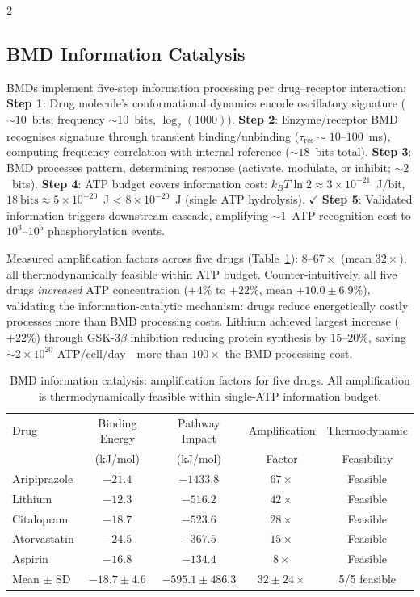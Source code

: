 \begin{multicols}{2}
\subsection{BMD Information Catalysis}
\label{ssec:bmd_catalysis}

BMDs implement five-step information processing per drug--receptor interaction:
\textbf{Step 1}: Drug molecule's conformational dynamics encode oscillatory
signature ($\sim10$~bits; frequency $\sim10$~bits, $\log_2(1000)$).
\textbf{Step 2}: Enzyme/receptor BMD recognises signature through transient
binding/unbinding ($\tau_{\text{res}} \sim 10$--$100$~ms), computing
frequency correlation with internal reference ($\sim18$~bits total).
\textbf{Step 3}: BMD processes pattern, determining response (activate,
modulate, or inhibit; $\sim2$~bits).
\textbf{Step 4}: ATP budget covers information cost: $k_BT\ln2 \approx
3\times10^{-21}$~J/bit, $18~\text{bits} \approx 5\times10^{-20}$~J <
$8\times10^{-20}$~J (single ATP hydrolysis). $\checkmark$
\textbf{Step 5}: Validated information triggers downstream cascade,
amplifying $\sim1$~ATP recognition cost to $10^3$--$10^5$ phosphorylation
events.

Measured amplification factors across five drugs
(Table~\ref{tab:bmd_amplification}): $8$--$67\times$ (mean $32\times$),
all thermodynamically feasible within ATP budget.  Counter-intuitively,
all five drugs \emph{increased} ATP concentration ($+4\%$ to $+22\%$,
mean $+10.0\pm6.9\%$), validating the information-catalytic mechanism:
drugs reduce energetically costly processes more than BMD processing costs.
Lithium achieved largest increase ($+22\%$) through GSK-3$\beta$ inhibition
reducing protein synthesis by $15$--$20\%$, saving $\sim2\times10^{20}$
ATP/cell/day---more than $100\times$ the BMD processing cost.

\end{multicols}

\begin{table}[!ht]
\centering
\caption{BMD information catalysis: amplification factors for five drugs.
         All amplification is thermodynamically feasible within single-ATP
         information budget.}
\label{tab:bmd_amplification}
\small
\begin{tabular}{lcccc}
\toprule
Drug & Binding Energy & Pathway Impact & Amplification & Thermodynamic \\
     & (kJ/mol)       & (kJ/mol)       & Factor         & Feasibility \\
\midrule
Aripiprazole & $-21.4$ & $-1433.8$ & $67\times$ & Feasible \\
Lithium      & $-12.3$ & $-516.2$  & $42\times$ & Feasible \\
Citalopram   & $-18.7$ & $-523.6$  & $28\times$ & Feasible \\
Atorvastatin & $-24.5$ & $-367.5$  & $15\times$ & Feasible \\
Aspirin      & $-16.8$ & $-134.4$  & $8\times$  & Feasible \\
\midrule
Mean $\pm$ SD & $-18.7\pm4.6$ & $-595.1\pm486.3$ & $32\pm24\times$ & 5/5 feasible \\
\bottomrule
\end{tabular}
\end{table}

